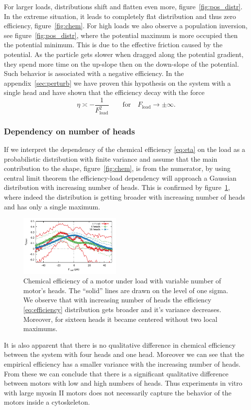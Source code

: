 \documentclass[aps,pre,twocolumn,showpacs,showkeys,superscriptaddress,floatfix]{revtex4-1}
\begin{document}
For larger loads, distributions shift and flatten even more, figure~\ref{fig:pos_distr}. 
In the extreme situation, it leads to completely flat distribution and thus zero efficiency, figure~\ref{fig:chem}.
For high loads we also observe a population inversion, see figure~\ref{fig:pos_distr}, 
where the potential maximum is more occupied then the potential minimum. 
This is due to the effective friction caused by the potential. 
As the particle gets slower when dragged along the potential gradient, 
 they spend more time on the up-slope then on the down-slope of the potential.
Such behavior is associated with a negative efficiency. 
In the appendix~\ref{sec:perturb} we have proven this hypothesis on the system with a single head and have shown that the efficiency decay with the force 
\[
\eta \asymp - \frac{1}{ F_\text{load}^2 } \qquad \text{for} \quad F_\text{load} \to \pm \infty .
\]

\subsubsection{Dependency on number of heads}
If we interpret the dependency of the chemical efficiency \eqref{eq:eta} on the load as a probabilistic distribution with finite variance and assume that the main contribution to the shape, figure~\ref{fig:chem}, is from the numerator, 
by using central limit theorem the efficiency-load dependency will approach a Gaussian distribution with increasing number of heads. 
This is confirmed by figure~\ref{fig:chem_eff_1head}, where indeed the distribution is getting broader with increasing number of heads and has only a single maximum.
\begin{figure}[t]
\centering
\includegraphics[width=0.45\textwidth,height=!]{chemical_cycle_1head}
\caption{
\label{fig:chem_eff_1head}
Chemical efficiency of a motor under load with variable number of motor's heads.
The ``solid'' lines are drawn on the level of one sigma. 
We observe that with increasing number of heads the efficiency \eqref{eq:efficiency} distribution gets broader and it's variance decreases.
Moreover, for sixteen heads it became centered without two local maximums.
}
\end{figure}
It is also apparent that there is no qualitative difference in chemical efficiency between the system with four heads and one head.
Moreover we can see that the empirical efficiency has a smaller variance with the increasing number of heads. 
From these we can conclude that there is a significant qualitative difference between motors with low and high numbers of heads. 
Thus experiments in vitro with large myosin II motors \cite{brown2009cross-correlated} does not necessarily capture the behavior of the motors inside a cytoskeleton. 
\end{document}
